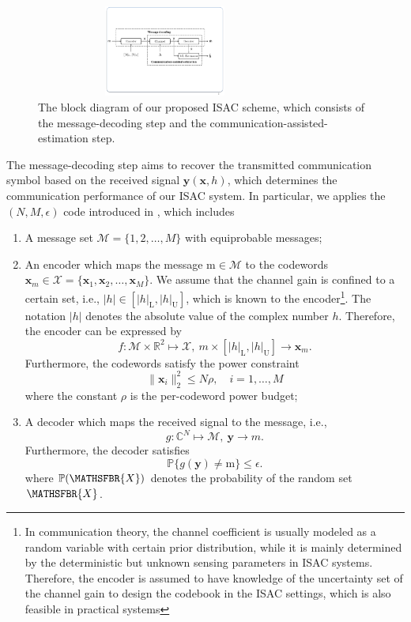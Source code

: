 \documentclass[conference,a4paper]{IEEEtran}
\makeatletter
\DeclareRobustCommand{\msf}[1]{%
	\ifcat\noexpand#1\relax\msfgreek{#1}\else\mathsfbr{#1}\fi%
}
\newcommand{\msfgreek}[1]{\csname s\expandafter\@gobble\string#1\endcsname}
\newcommand{\RS}[1]{\MakeUppercase{\msf{#1}}} %
\newcommand{\V}[1]{\bm{#1}} %
\makeatother
\begin{document}
\begin{figure}[t]
    \centering
    \includegraphics[width = 8.5cm, height = 3cm]{Fig_scheme.pdf}
    \caption{ The block diagram of our proposed ISAC scheme, which consists of the message-decoding step and the communication-assisted-estimation step.}
    \label{Fig_scheme}
\end{figure}

The message-decoding step aims to recover the transmitted communication symbol based on the received signal $\mathbf{y}(\mathbf{x},h)$, which determines the communication performance of our ISAC system. In particular, we applies the $(N,M,\epsilon)$ code introduced in \cite{PolPooVer:J10}, which includes
\begin{enumerate}
    \item A message set $\mathcal{M} = \{1,2,\ldots,M\}$ with equiprobable messages;
    \item An encoder which maps the message $\mathrm{m}\in\mathcal{M}$ to the codewords $\V{x}_m \in \mathcal{X} = \{\V{x}_1,\V{x}_2,\ldots,\V{x}_M\}$. We assume that the channel gain is confined to a certain set, i.e., $|h| \in [|h|_\mathrm{L},|h|_\mathrm{U}]$, which is known to the encoder\footnote{In communication theory, the channel coefficient is usually modeled as a random variable with certain prior distribution, while it is mainly determined by the deterministic but unknown sensing parameters in ISAC systems. Therefore, the encoder is assumed to have knowledge of the uncertainty set of the channel gain to design the codebook in the ISAC settings, which is also feasible in practical systems}. The notation $|h|$ denotes the absolute value of the complex number $h$. Therefore, the encoder can be expressed by
    \begin{equation}
        f: \mathcal{M}\times\mathbb{R}^2\mapsto \mathcal{X},\ m\times [|h|_\mathrm{L},|h|_\mathrm{U}]\to\V{x}_m.
    \end{equation}
    Furthermore, the codewords satisfy the power constraint
    \begin{equation}
    \label{Power-constraint}
        \|\V{x}_i\|_2^2 \leq N\rho, \quad i=1,\ldots,M
    \end{equation}
    where the constant $\rho$ is the per-codeword power budget;
    \item A decoder which maps the received signal to the message, i.e.,
    \begin{equation}
        g: \mathbb{C}^N \mapsto \mathcal{M}, \ \mathbf{y}\to m.
    \end{equation}
    Furthermore, the decoder satisfies
    \begin{equation}
        \mathbb{P}\{g(\mathbf{y})\neq \mathrm{m}\} \leq \epsilon.
    \end{equation}
    where $\mathbb{P}(\RS{X})$ denotes the probability of the random set $\RS{X}$.
\end{enumerate}
\end{document}

